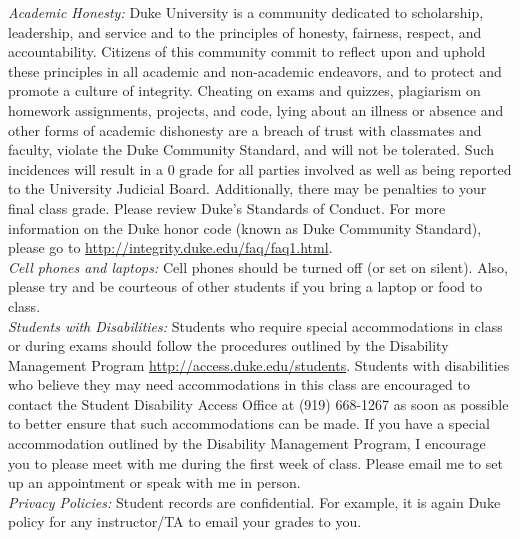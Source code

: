 \documentclass[11pt]{article}
\begin{document}
\emph{Academic Honesty:} Duke University is a community dedicated to scholarship, leadership, and service and to the principles of honesty, fairness, respect, and accountability. Citizens of this community commit to reflect upon and uphold these principles in all academic and non-academic endeavors, and to protect and promote a culture of integrity. Cheating on exams and quizzes, plagiarism on homework assignments, projects, and code, lying about an illness or absence and other forms of academic dishonesty are a breach of trust with classmates and faculty, violate the Duke Community Standard, and will not be tolerated. Such incidences will result in a 0 grade for all parties involved as well as being reported to the University Judicial Board. Additionally, there may be penalties to your final class grade. Please review Duke's Standards of Conduct. For more information on the Duke honor code (known as Duke Community Standard), please go to \url{http://integrity.duke.edu/faq/faq1.html}. \\

\emph{Cell phones and laptops:} Cell phones should be turned off (or set on silent). Also, please try and be courteous of other students if you bring a laptop or food to class. \\


\emph{Students with Disabilities:} Students who require special accommodations in class or during exams should follow the procedures outlined by the Disability Management Program \url{http://access.duke.edu/students}. Students with disabilities who believe they may need accommodations in this class are encouraged to contact the Student Disability Access Office at (919) 668-1267 as soon as possible to better ensure that such accommodations can be made. If you have a special accommodation outlined by the Disability Management Program, I encourage you to please meet with me during the first week of class. Please email me to set up an appointment or speak with me in person. \\

\emph{Privacy Policies:} 
Student records are confidential. For example, it is again Duke policy for any instructor/TA to email your grades to you. 
\end{document}
